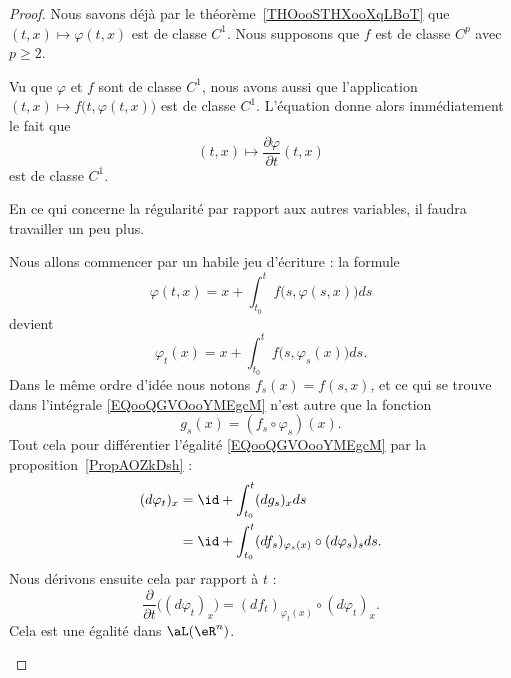 \begin{proof}
	Nous savons déjà par le théorème~\ref{THOooSTHXooXqLBoT} que \( (t,x)\mapsto \varphi(t,x)\) est de classe \( C^1\). Nous supposons que \( f\) est de classe \( C^p\) avec \( p\geq 2\).

	Vu que \( \varphi\) et \( f\) sont de classe \( C^1\), nous avons aussi que l'application \( (t,x)\mapsto f\big( t,\varphi(t,x) \big)\) est de classe \( C^1\). L'équation donne alors immédiatement le fait que
	\begin{equation}
		(t,x)\mapsto\frac{ \partial \varphi }{ \partial t }(t,x)
	\end{equation}
	est de classe \( C^1\).

	En ce qui concerne la régularité par rapport aux autres variables, il faudra travailler un peu plus.

	\begin{subproof}
		Nous allons commencer par un habile jeu d'écriture : la formule
		\begin{equation}
			\varphi(t,x)=x+\int_{t_0}^tf\big( s,\varphi(s,x) \big)ds
		\end{equation}
		devient
		\begin{equation}        \label{EQooQGVOooYMEgcM}
			\varphi_t(x)=x+\int_{t_0}^tf\big( s,\varphi_s(x) \big)ds.
		\end{equation}
		Dans le même ordre d'idée nous notons \( f_s(x)=f(s,x)\), et ce qui se trouve dans l'intégrale \eqref{EQooQGVOooYMEgcM} n'est autre que la fonction
		\begin{equation}
			g_s(x)=(f_s\circ\varphi_s)(x).
		\end{equation}
		Tout cela pour différentier l'égalité \eqref{EQooQGVOooYMEgcM} par la proposition~\ref{PropAOZkDsh} :
		\begin{subequations}
			\begin{align}
				(d\varphi_t)_x & =\id+\int_{t_0}^t(dg_s)_xds                                  \\
				               & =\id+\int_{t_0}^t(df_s)_{\varphi_s(x)}\circ(d\varphi_s)_sds.
			\end{align}
		\end{subequations}
		Nous dérivons ensuite cela par rapport à \( t\) :
		\begin{equation}        \label{EQooBETGooXKWRxX}
			\frac{ \partial  }{ \partial t }\Big( (d\varphi_t)_x \Big)=(df_t)_{\varphi_t(x)}\circ(d\varphi_t)_x.
		\end{equation}
		Cela est une égalité dans \( \aL(\eR^n)\).


\end{subproof}
\end{proof}
